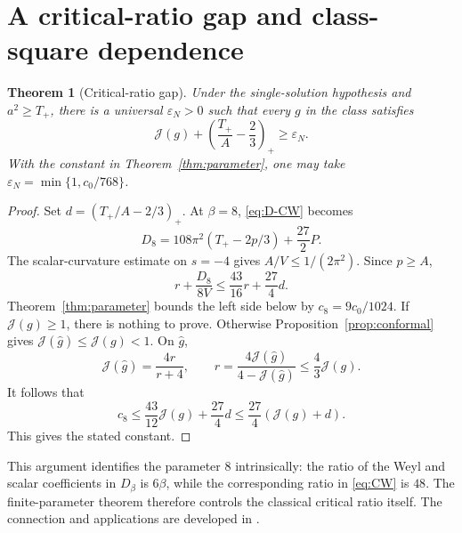 \documentclass[11pt,a4paper]{article}
\newtheorem{theorem}{Theorem}[section]
\theoremstyle{definition}
\theoremstyle{remark}
\newcommand{\J}{\mathcal J}
\begin{document}
\section{A critical-ratio gap and class-square dependence}
\begin{theorem}[Critical-ratio gap]\label{thm:N1}
Under the single-solution hypothesis and $a^2\ge T_+$, there is a universal $\varepsilon_N>0$ such that every $g$ in the class satisfies
\begin{equation}
 \J(g)+\left(\frac{T_+}{A}-\frac23\right)_+\ge\varepsilon_N.
 \label{eq:N1}
\end{equation}
With the constant in Theorem~\ref{thm:parameter}, one may take
$\varepsilon_N=\min\{1,c_0/768\}$.
\end{theorem}
\begin{proof}
Set $d=(T_+/A-2/3)_+$. At $\beta=8$, \eqref{eq:D-CW} becomes
\begin{equation}
 D_8=108\pi^2(T_+-2p/3)+\frac{27}{2}P.
 \label{eq:D8}
\end{equation}
The scalar-curvature estimate on $s=-4$ gives $A/V\le1/(2\pi^2)$. Since $p\ge A$,
\[
 r+\frac{D_8}{8V}\le\frac{43}{16}r+\frac{27}{4}d.
\]
Theorem~\ref{thm:parameter} bounds the left side below by $c_8=9c_0/1024$. If $\J(g)\ge1$, there is nothing to prove. Otherwise Proposition~\ref{prop:conformal} gives $\J(\widehat g)\le\J(g)<1$. On $\widehat g$,
\[
 \J(\widehat g)=\frac{4r}{r+4},\qquad
 r=\frac{4\J(\widehat g)}{4-\J(\widehat g)}\le\frac43\J(g).
\]
It follows that
\[
 c_8\le\frac{43}{12}\J(g)+\frac{27}{4}d
 \le\frac{27}{4}(\J(g)+d).
\]
This gives the stated constant.
\end{proof}

This argument identifies the parameter $8$ intrinsically: the ratio of the Weyl and scalar coefficients in $D_\beta$ is $6\beta$, while the corresponding ratio in \eqref{eq:CW} is $48$. The finite-parameter theorem therefore controls the classical critical ratio itself. The connection and applications are developed in \cite{N1source}.
\end{document}
